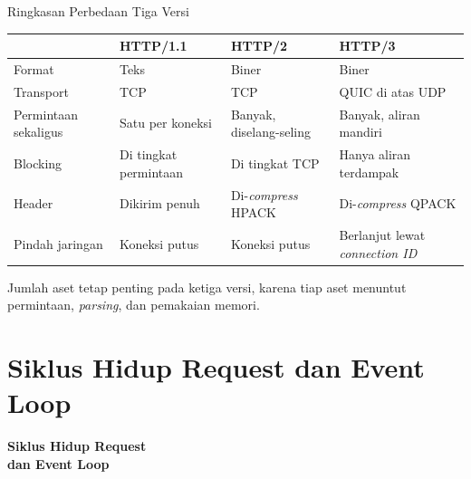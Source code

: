 \documentclass[aspectratio=169, table, 12pt]{beamer}
\begin{document}
\begin{frame}{{\Large Ringkasan Perbedaan Tiga Versi}}
  \vspace{5pt}
  \centering
  {\small
  \begin{tabularx}{\textwidth}{lXXX}
    \hline
     & \textbf{HTTP/1.1} & \textbf{HTTP/2} & \textbf{HTTP/3} \\
    \hline
    Format & Teks & Biner & Biner \\
    \hline
    Transport & TCP & TCP & QUIC di atas UDP \\
    \hline
    Permintaan sekaligus & Satu per koneksi & Banyak, diselang-seling & Banyak, aliran mandiri \\
    \hline
    Blocking & Di tingkat permintaan & Di tingkat TCP & Hanya aliran terdampak \\
    \hline
    Header & Dikirim penuh & Di-\textit{compress} HPACK & Di-\textit{compress} QPACK \\
    \hline
    Pindah jaringan & Koneksi putus & Koneksi putus & Berlanjut lewat \textit{connection ID} \\
    \hline
  \end{tabularx}}

  \vspace{8pt}
  {\footnotesize Jumlah aset tetap penting pada ketiga versi, karena tiap aset
  menuntut permintaan, \textit{parsing}, dan pemakaian memori.}
\end{frame}

\section{Siklus Hidup Request dan Event Loop}

\begin{frame}{\hfill}
  \centering
  \Huge{\textbf{Siklus Hidup Request\\dan Event Loop}}
\end{frame}
\end{document}
